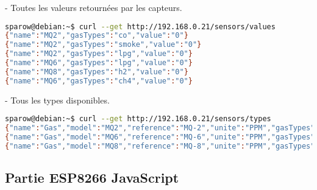- Toutes les valeurs retournées par les capteurs.
\begin{lstlisting}[language=bash]
sparow@debian:~$ curl --get http://192.168.0.21/sensors/values
{"name":"MQ2","gasTypes":"co","value":"0"}
{"name":"MQ2","gasTypes":"smoke","value":"0"}
{"name":"MQ2","gasTypes":"lpg","value":"0"}
{"name":"MQ6","gasTypes":"lpg","value":"0"}
{"name":"MQ8","gasTypes":"h2","value":"0"}
{"name":"MQ6","gasTypes":"ch4","value":"0"}
\end{lstlisting}

- Tous les types disponibles.
\begin{lstlisting}[language=bash]
sparow@debian:~$ curl --get http://192.168.0.21/sensors/types
{"name":"Gas","model":"MQ2","reference":"MQ-2","unite":"PPM","gasTypes":["LPG","CO","SMOKE"]}
{"name":"Gas","model":"MQ6","reference":"MQ-6","unite":"PPM","gasTypes":["LPG","CH4"]}
{"name":"Gas","model":"MQ8","reference":"MQ-8","unite":"PPM","gasTypes":["H2"]}
\end{lstlisting}



\subsection{Partie ESP8266 JavaScript}



